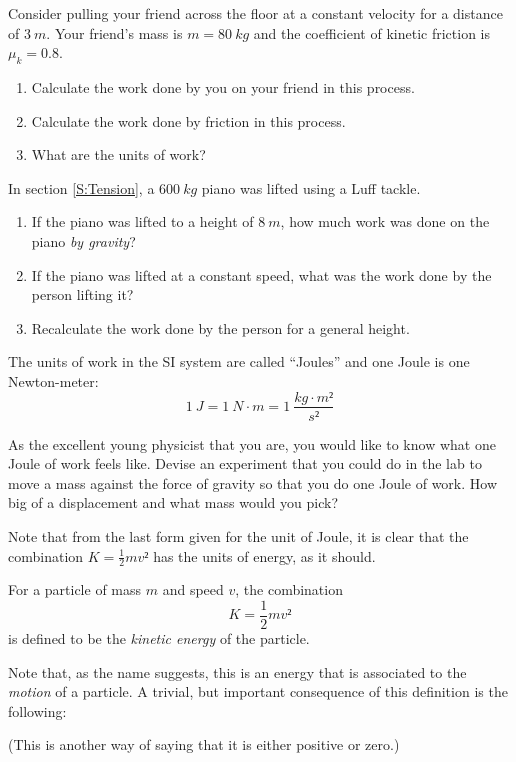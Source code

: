 \begin{exercise}
Consider pulling your friend across the floor at a constant velocity for a distance of $3\ m$. Your friend's mass is $m = 80\ kg$ and the coefficient of kinetic friction is $μ_k = 0.8$. 
\begin{enumerate}
	\item Calculate the work done by you on your friend in this process. 
	\item Calculate the work done by friction in this process.
	\item What are the units of work?
\end{enumerate}
\end{exercise}

\begin{exercise}
In section \ref{S:Tension}, a $600\ kg$ piano was lifted using a Luff tackle. 
\begin{enumerate}
	\item If the piano was lifted to a height of $8\ m$, how much work was done on the piano {\em by gravity}?
	\item If the piano was lifted at a constant speed, what was the work done by the person lifting it?
	\item Recalculate the work done by the person for a general height. 
\end{enumerate}	
\end{exercise}

The units of work in the SI system are called “Joules” and one Joule is one Newton-meter:
$$
1\ J = 1\ N\cdot m = 1\  \frac{kg\cdot m²}{s²}
$$

\begin{exercise}
As the excellent young physicist that you are, you would like to know what one Joule of work feels like. Devise an experiment that you could do in the lab to move a mass against the force of gravity so that you do one Joule of work. How big of a displacement and what mass would you pick?
\end{exercise}

Note that from the last form given for the unit of Joule, it is clear that the combination $K=\frac12 mv²$ has the units of energy, as it should.
\begin{definition}
For a particle of mass $m$ and speed $v$, the combination 
$$
K = \frac12 m v² 
$$
is defined to be the {\em kinetic energy} of the particle. 
\end{definition}
Note that, as the name suggests, this is an energy that is associated to the {\em motion} of a particle. A trivial, but important consequence of this definition is the following:
\begin{quote}
\end{quote}
(This is another way of saying that it is either positive or zero.)

